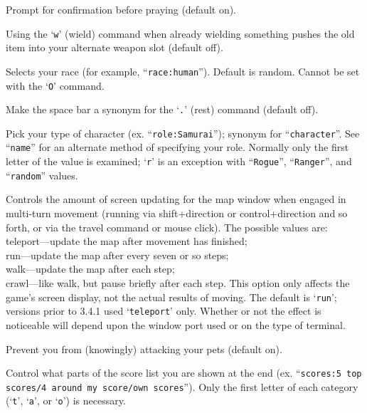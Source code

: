 \item[\ib{prayconfirm}]
Prompt for confirmation before praying (default on).

\item[\ib{pushweapon}]
Using the `{\tt w}' (wield) command when already wielding
something pushes the old item into your alternate weapon slot (default off).

\item[\ib{race}]
Selects your race (for example, ``{\tt race:human}'').  Default is random.
Cannot be set with the `{\tt O}' command.

\item[\ib{rest\_on\_space}]
Make the space bar a synonym for the `{\tt .}' (rest) command (default off).

\item[\ib{role}]
Pick your type of character (ex. ``{\tt role:Samurai}'');
synonym for ``{\tt character}''.  See ``{\tt name}'' for an alternate method
of specifying your role.  Normally only the first letter of the
value is examined; `{\tt r}' is an exception with ``{\tt Rogue}'', ``{\tt Ranger}'',
and ``{\tt random}'' values.

\item[\ib{runmode}]
Controls the amount of screen updating for the map window when engaged
in multi-turn movement (running via shift+direction or control+direction
and so forth, or via the travel command or mouse click).
The possible values are:
teleport---update the map after movement has finished;\\
run---update the map after every seven or so steps;\\
walk---update the map after each step;\\
crawl---like walk, but pause briefly after each step.
This option only affects the game's screen display, not the actual
results of moving.  The default is `{\tt run}'; versions prior to 3.4.1 
used `{\tt teleport}' only.  Whether or not the effect is noticeable will
depend upon the window port used or on the type of terminal.

\item[\ib{safe\_pet}]
Prevent you from (knowingly) attacking your pets (default on).

\item[\ib{scores}]
Control what parts of the score list you are shown at the end (ex.
``{\tt scores:5 top scores/4 around my score/own scores}'').  Only the first
letter of each category (`{\tt t}', `{\tt a}', or `{\tt o}') is necessary.

